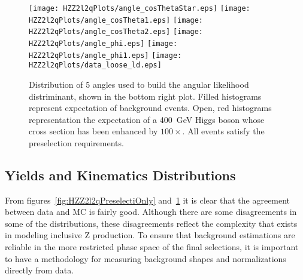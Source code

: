 \begin{figure}
\begin{center}
\texttt{[image: HZZ2l2qPlots/angle\_cosThetaStar.eps]}
\texttt{[image: HZZ2l2qPlots/angle\_cosTheta1.eps]}
\texttt{[image: HZZ2l2qPlots/angle\_cosTheta2.eps]}
\texttt{[image: HZZ2l2qPlots/angle\_phi.eps]}
\texttt{[image: HZZ2l2qPlots/angle\_phi1.eps]}
\texttt{[image: HZZ2l2qPlots/data\_loose\_ld.eps]}
\caption{Distribution of 5 angles used to build the angular 
likelihood distriminant, shown in the bottom right plot. Filled
histograms represent expectation
of background events.  Open, red histograms representation the 
expectation of a 400~GeV Higgs boson whose cross section has been
enhanced by $100\times$.  All events satisfy the preselection
requirements.  }
\label{fig:HZZ2l2qAngularLD}
\end{center}
\end{figure}

\subsection{Yields and Kinematics Distributions}
\label{sec:HZZ2l2qyields}

From figures~\ref{fig:HZZ2l2qPreselectiOnly} and~\ref{fig:HZZ2l2qAngularLD}
it is clear that the agreement between data and MC is fairly good.  
Although there are some disagreements in some of the distributions,
these disagreements reflect the complexity that exists in modeling
inclusive Z production.  To ensure that background estimations are
reliable in the more restricted phase space of the final selections,
it is important to have a methodology for measuring background 
shapes and normalizations directly from data.

